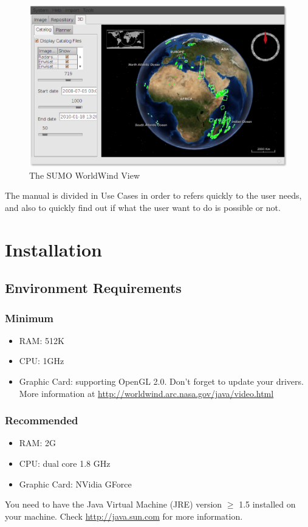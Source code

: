 \documentclass[12pt,a4paper,final]{report}
\begin{document}
\begin{figure}[H]
 \centering
 \includegraphics[scale=0.5,keepaspectratio=true]{./images/SUMOWWView.png}
 \caption{The SUMO WorldWind View}
\end{figure}

The manual is divided in Use Cases in order to refers quickly to the user needs, and also to quickly find out if what the user want to do is possible or not.

\chapter{Installation}
\section{Environment Requirements}
\subsection{Minimum}
\begin{itemize}
\item RAM: 512K
\item CPU: 1GHz
\item Graphic Card: supporting OpenGL 2.0. Don't forget to update your drivers.
More information at \url{http://worldwind.arc.nasa.gov/java/video.html}
\end{itemize}
\subsection{Recommended}
\begin{itemize}
\item RAM: 2G
\item CPU: dual core 1.8 GHz
\item Graphic Card: NVidia GForce
\end{itemize}
You need to have the Java Virtual Machine (JRE) version $\geq$ 1.5 installed on your machine.
Check \url{http://java.sun.com} for more information.
\end{document}
